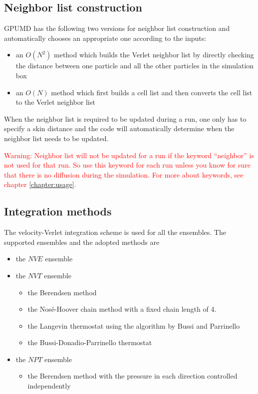\documentclass[12pt,a4paper]{report}
\begin{document}
\subsection{Neighbor list construction}

GPUMD has the following two versions for neighbor list construction and automatically chooses an appropriate one according to the inputs:
  \begin{itemize}
  \item an $O(N^2)$ method which builds the Verlet neighbor list by directly checking the distance between one particle and all the other particles in the simulation box
  \item an $O(N)$ method which first builds a cell list and then converts the cell list to the Verlet neighbor list
  \end{itemize}
When the neighbor list is required to be updated during a run, one only has to specify a skin distance and the code will automatically determine when the neighbor list needs to be updated.

\textcolor{red}{Warning: Neighbor list will not be updated for a run if the keyword ``neighbor'' is not used for that run. So use this keyword for each run unless you know for sure that there is no diffusion during the simulation. For more about keywords, see chapter \ref{chapter:usage}.}


\subsection{Integration methods}

The velocity-Verlet \cite{swope1982jcp} integration scheme is used for all the ensembles.
The supported ensembles and the adopted methods are
  \begin{itemize}
  \item the $NVE$ ensemble
  \item the $NVT$ ensemble
    \begin{itemize}
    \item the Berendsen method  \cite{berendsen1984jcp}
    \item the Nos\'{e}-Hoover chain method \cite{nose1984jcp,hoover1985pra,martyna1992jcp,martyna1996mp,tuckerman2010}
        with a fixed chain length of 4.
    \item the Langevin thermostat using the algorithm by Bussi and Parrinello \cite{bussi2007pre}
    \item the Bussi-Donadio-Parrinello thermostat \cite{bussi2007jcp}
    \end{itemize}
  \item the $NPT$ ensemble
    \begin{itemize}
    \item the Berendsen method  \cite{berendsen1984jcp} with the pressure in each direction controlled independently
    \end{itemize}
  \end{itemize}
\end{document}
